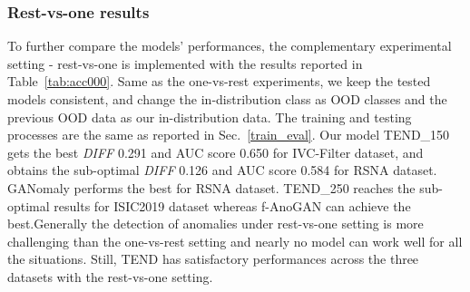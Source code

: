 \documentclass[12pt]{spieman}  %
\begin{document}
\begin{spacing}{2}
\subsubsection{Rest-vs-one results}
To further compare the models' performances, the complementary experimental setting - rest-vs-one is implemented with the results reported in Table~\ref{tab:acc000}. Same as the one-vs-rest experiments, we keep the tested models consistent, and change the in-distribution class as OOD classes and the previous OOD data as our in-distribution data. The training and testing processes are the same as reported in Sec.~\ref{train_eval}. {Our model TEND\_150 gets the best \textit{DIFF} 0.291 and AUC score 0.650 for IVC-Filter dataset, and obtains the sub-optimal \textit{DIFF} 0.126 and
AUC score 0.584 for RSNA dataset.} GANomaly performs the best for RSNA dataset. TEND\_250 reaches the sub-optimal results for ISIC2019 dataset whereas f-AnoGAN can achieve the best.Generally the detection of anomalies under rest-vs-one setting is more challenging than the one-vs-rest setting and nearly no model can work well for all the situations. Still, TEND has satisfactory performances across the three datasets with the rest-vs-one setting. 


\end{spacing}
\end{document}

